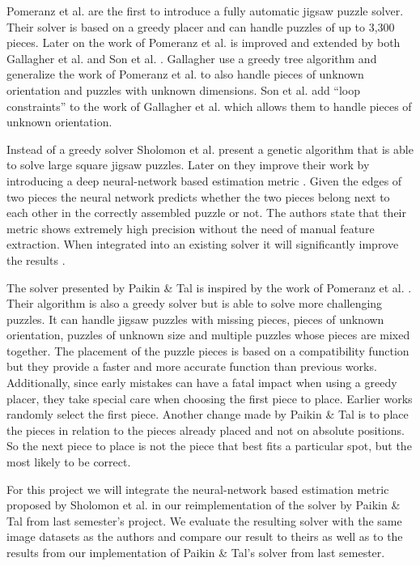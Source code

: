 \documentclass[11pt]{report}
\begin{document}
Pomeranz et al.\cite{Pomeranz2011} are the first to introduce a fully automatic
jigsaw puzzle solver. Their solver is based on a greedy placer and can handle
puzzles of up to 3,300 pieces. Later on the work of Pomeranz et al. is improved
and extended by both Gallagher et al. \cite{gallagher2012jigsaw} and Son et al.
\cite{son2014solving}. Gallagher use a greedy tree algorithm and generalize the
work of Pomeranz et al. to also handle pieces of unknown orientation and puzzles
with unknown dimensions. Son et al. add ``loop constraints'' to the work of
Gallagher et al. which allows them to handle pieces of unknown orientation.

Instead of a greedy solver Sholomon et al. \cite{sholomon2013genetic} present a
genetic algorithm that is able to solve large square jigsaw puzzles. Later on
they improve their work by introducing a deep neural-network based estimation
metric \cite{sholomon2016dnn}. Given the edges of two pieces the neural network
predicts whether the two pieces belong next to each other in the correctly
assembled puzzle or not. The authors state that their metric shows
extremely high precision without the need of manual feature extraction. When
integrated into an existing solver it will significantly improve the results
\cite{sholomon2016dnn}. 

The solver presented by Paikin \& Tal \cite{Paikin2015} is inspired by the work
of Pomeranz et al. \cite{Pomeranz2011}. Their algorithm is also a greedy solver
but is able to solve more challenging puzzles. It can handle jigsaw puzzles with
missing pieces, pieces of unknown orientation, puzzles of unknown size and
multiple puzzles whose pieces are mixed together. The placement of the puzzle
pieces is based on a compatibility function but they provide a faster and more
accurate function than previous works. Additionally, since early mistakes can
have a fatal impact when using a greedy placer, they take special care when
choosing the first piece to place. Earlier works randomly select the first
piece. Another change made by Paikin \& Tal is to place the pieces in relation
to the pieces already placed and not on absolute positions. So the next piece to
place is not the piece that best fits a particular spot, but the most likely to
be correct.

For this project we will integrate the neural-network based estimation metric
proposed by Sholomon et al. \cite{sholomon2016dnn} in our reimplementation of the
solver by Paikin \& Tal \cite{Paikin2015} from last semester's project. We evaluate the resulting
solver with the same image datasets as the authors and compare our result to
theirs as well as to the results from our implementation of Paikin \& Tal's
solver from last semester.
\end{document}
